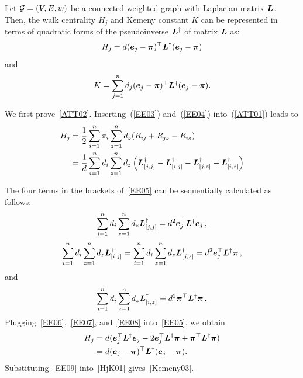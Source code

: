 \documentclass[10pt,twocolumn,twoside]{IEEEtran}
\begin{document}
\begin{lemma}
    \label{HjK} Let \(\mathcal{G}=(V,E,w)\) be a connected weighted graph  with  Laplacian matrix \(\boldsymbol{L}\). Then, the walk centrality \(H_j\) and Kemeny constant \(K\) can be represented  in terms of quadratic forms of the pseudoinverse \(\boldsymbol{L}^{\dagger}\)  of   matrix  \(\boldsymbol{L}\) as:
    \begin{equation}\label{ATT02}
        H_j=d(\boldsymbol{e}_j - \boldsymbol{\pi})^{\top} \boldsymbol{L}^{\dagger} (\boldsymbol{e}_j - \boldsymbol{\pi})
    \end{equation}
    and
    \begin{equation}\label{Kemeny03}
        K= \sum_{j=1}^{n} d_j (\boldsymbol{e}_j - \boldsymbol{\pi})^{\top} \boldsymbol{L}^{\dagger} (\boldsymbol{e}_j - \boldsymbol{\pi}).
    \end{equation}
\end{lemma}
\begin{IEEEproof}
    We first prove~\eqref{ATT02}. Inserting~(\ref{EE03}) and~(\ref{EE04}) into~(\ref{ATT01}) leads to
    \begin{equation}\label{EE05}
        \begin{split}
            H_j&=\frac{1}{2} \sum_{i=1}^{n} \pi_i \sum_{z=1}^{n} d_z(R_{ij}+R_{jz}-R_{iz}) \\
            &=\frac{1}{d} \sum_{i=1}^{n} d_i \sum_{z=1}^{n} d_z \left({\boldsymbol{L}}_{[j,j]}^{\dagger}-{\boldsymbol{L}}_{[i,j]}^{\dagger}-{\boldsymbol{L}}_{[j,z]}^{\dagger}+{\boldsymbol{L}}_{[i,z]}^{\dagger}\right) \\
        \end{split}
    \end{equation}

    The four terms in the brackets of~\eqref{EE05} can be sequentially calculated as follows:
    \begin{equation}\label{EE06}
        \sum_{i=1}^{n} d_i \sum_{z=1}^{n} d_z {\boldsymbol{L}}_{[j,j]}^{\dagger}=d^2 \boldsymbol{e}_j^{\top} \boldsymbol{L}^{\dagger} \boldsymbol{e}_j\,,
    \end{equation}
    \begin{equation}\label{EE07}
        \sum_{i=1}^{n} d_i \sum_{z=1}^{n} d_z {\boldsymbol{L}}_{[i,j]}^{\dagger}=\sum_{i=1}^{n} d_i \sum_{z=1}^{n} d_z {\boldsymbol{L}}_{[j,z]}^{\dagger}=d^2 \boldsymbol{e}_j^{\top} \boldsymbol{L}^{\dagger} \boldsymbol{\pi}\,,
    \end{equation}
    and
    \begin{equation}\label{EE08}
        \sum_{i=1}^{n} d_i  \sum_{z=1}^{n} d_z {\boldsymbol{L}}_{[i,z]}^{\dagger}=d^2 \boldsymbol{\pi}^{\top} \boldsymbol{L}^{\dagger} \boldsymbol{\pi} \,.
    \end{equation}
    Plugging~\eqref{EE06},~\eqref{EE07}, and~\eqref{EE08}  into~\eqref{EE05}, we obtain
    \begin{equation}\label{EE09}
        \begin{split}
            H_j&=d(\boldsymbol{e}_j^{\top} \boldsymbol{L}^{\dagger} \boldsymbol{e}_j - 2 \boldsymbol{e}_j^{\top} \boldsymbol{L}^{\dagger} \boldsymbol{\pi} + \boldsymbol{\pi}^{\top} \boldsymbol{L}^{\dagger} \boldsymbol{\pi}) \\
            &=d(\boldsymbol{e}_j - \boldsymbol{\pi})^{\top} \boldsymbol{L}^{\dagger} (\boldsymbol{e}_j - \boldsymbol{\pi}).
        \end{split}
    \end{equation}
    Substituting~\eqref{EE09}  into~\eqref{HjK01} gives~\eqref{Kemeny03}.
\end{IEEEproof}
\end{document}

